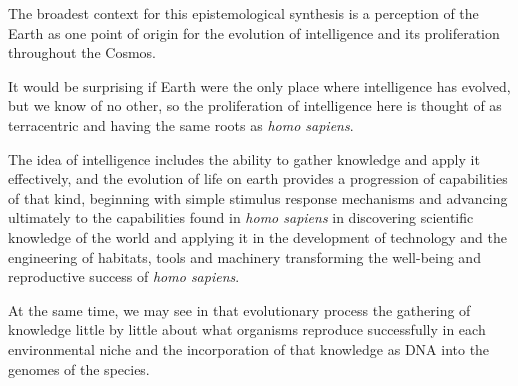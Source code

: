 
The broadest context for this epistemological synthesis is a perception of the Earth as one point of origin for the evolution of intelligence and its proliferation throughout the Cosmos.

It would be surprising if Earth were the only place where intelligence has evolved, but we know of no other, so the proliferation of intelligence here is thought of as terracentric and having the same roots as \emph{homo sapiens}.

The idea of intelligence includes the ability to gather knowledge and apply it effectively, and the evolution of life on earth provides a progression of capabilities of that kind, beginning with simple stimulus response mechanisms and advancing ultimately to the capabilities found in \emph{homo sapiens} in discovering scientific knowledge of the world and applying it in the development of technology and the engineering of habitats, tools and machinery transforming the well-being and reproductive success of \emph{homo sapiens}.

At the same time, we may see in that evolutionary process the gathering of knowledge little by little about what organisms reproduce successfully in each environmental niche and the incorporation of that knowledge as DNA into the genomes of the species.

\cite{gordon1933}

